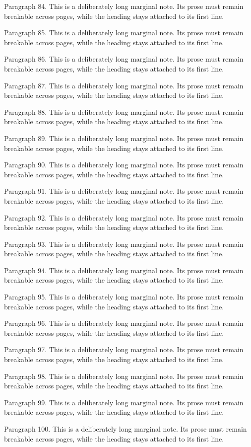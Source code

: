 \documentclass[11pt]{article}
\begin{document}
{Paragraph 84. This is a deliberately long marginal note. Its prose must remain breakable across pages, while the heading stays attached to its first line.\par
Paragraph 85. This is a deliberately long marginal note. Its prose must remain breakable across pages, while the heading stays attached to its first line.\par
Paragraph 86. This is a deliberately long marginal note. Its prose must remain breakable across pages, while the heading stays attached to its first line.\par
Paragraph 87. This is a deliberately long marginal note. Its prose must remain breakable across pages, while the heading stays attached to its first line.\par
Paragraph 88. This is a deliberately long marginal note. Its prose must remain breakable across pages, while the heading stays attached to its first line.\par
Paragraph 89. This is a deliberately long marginal note. Its prose must remain breakable across pages, while the heading stays attached to its first line.\par
Paragraph 90. This is a deliberately long marginal note. Its prose must remain breakable across pages, while the heading stays attached to its first line.\par
Paragraph 91. This is a deliberately long marginal note. Its prose must remain breakable across pages, while the heading stays attached to its first line.\par
Paragraph 92. This is a deliberately long marginal note. Its prose must remain breakable across pages, while the heading stays attached to its first line.\par
Paragraph 93. This is a deliberately long marginal note. Its prose must remain breakable across pages, while the heading stays attached to its first line.\par
Paragraph 94. This is a deliberately long marginal note. Its prose must remain breakable across pages, while the heading stays attached to its first line.\par
Paragraph 95. This is a deliberately long marginal note. Its prose must remain breakable across pages, while the heading stays attached to its first line.\par
Paragraph 96. This is a deliberately long marginal note. Its prose must remain breakable across pages, while the heading stays attached to its first line.\par
Paragraph 97. This is a deliberately long marginal note. Its prose must remain breakable across pages, while the heading stays attached to its first line.\par
Paragraph 98. This is a deliberately long marginal note. Its prose must remain breakable across pages, while the heading stays attached to its first line.\par
Paragraph 99. This is a deliberately long marginal note. Its prose must remain breakable across pages, while the heading stays attached to its first line.\par
Paragraph 100. This is a deliberately long marginal note. Its prose must remain breakable across pages, while the heading stays attached to its first line.\par}
\end{document}
